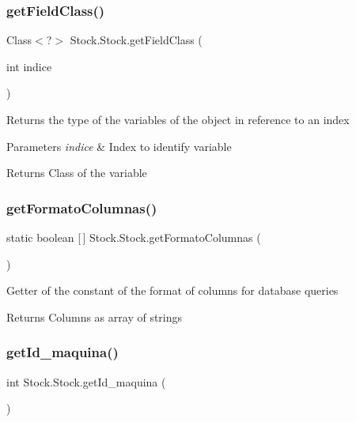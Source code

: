 \subsubsection{\texorpdfstring{get\+Field\+Class()}{getFieldClass()}}
{\footnotesize\ttfamily Class$<$?$>$ Stock.\+Stock.\+get\+Field\+Class (\begin{DoxyParamCaption}\item[{int}]{indice }\end{DoxyParamCaption})}

Returns the type of the variables of the object in reference to an index


\begin{DoxyParams}{Parameters}
{\em indice} & Index to identify variable \\
\hline
\end{DoxyParams}
\begin{DoxyReturn}{Returns}
Class of the variable 
\end{DoxyReturn}
\mbox{\label{class_stock_1_1_stock_a69b313abfef5b90dcdf378ea5a711618}} 
\subsubsection{\texorpdfstring{get\+Formato\+Columnas()}{getFormatoColumnas()}}
{\footnotesize\ttfamily static boolean \mbox{[}$\,$\mbox{]} Stock.\+Stock.\+get\+Formato\+Columnas (\begin{DoxyParamCaption}{ }\end{DoxyParamCaption})\hspace{0.3cm}{\ttfamily [static]}}

Getter of the constant of the format of columns for database queries

\begin{DoxyReturn}{Returns}
Columns as array of strings 
\end{DoxyReturn}
\mbox{\label{class_stock_1_1_stock_acecc43ec5fb13d91e02be7394af1130b}} 
\subsubsection{\texorpdfstring{get\+Id\+\_\+maquina()}{getId\_maquina()}}
{\footnotesize\ttfamily int Stock.\+Stock.\+get\+Id\+\_\+maquina (\begin{DoxyParamCaption}{ }\end{DoxyParamCaption})}

